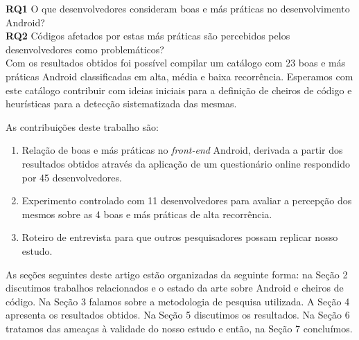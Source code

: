 \textbf{RQ1} O que desenvolvedores consideram boas e más práticas no desenvolvimento Android? \\

\textbf{RQ2} Códigos afetados por estas más práticas são percebidos pelos desenvolvedores como problemáticos? \\

Com os resultados obtidos foi possível compilar um catálogo com 23 boas e más práticas Android classificadas em alta, média e baixa recorrência. Esperamos com este catálogo contribuir com ideias iniciais para a definição de cheiros de código e heurísticas para a detecção sistematizada das mesmas.

As contribuições deste trabalho são:

\begin{enumerate}

	\item Relação de boas e más práticas no \textit{front-end} Android, derivada a partir dos resultados obtidos através da aplicação de um questionário online respondido por 45 desenvolvedores.

	\item Experimento controlado com 11 desenvolvedores para avaliar a percepção dos mesmos sobre as 4 boas e más práticas de alta recorrência.

	\item Roteiro de entrevista para que outros pesquisadores possam replicar nosso estudo.
\end{enumerate}

As seções seguintes deste artigo estão organizadas da seguinte forma: na Seção 2 discutimos trabalhos relacionados e o estado da arte sobre Android e cheiros de código. Na Seção 3 falamos sobre a metodologia de pesquisa utilizada. A Seção 4 apresenta os resultados obtidos. Na Seção 5 discutimos os resultados. Na Seção 6 tratamos das ameaças à validade do nosso estudo e então, na Seção 7 concluímos.
